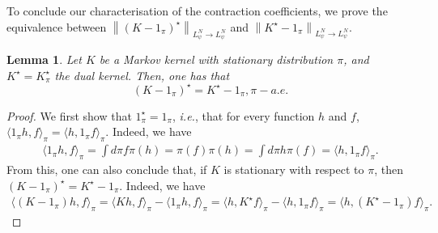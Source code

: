 \documentclass[11pt]{article}
\theoremstyle{plain}
\newtheorem{lemma}[theorem]{Lemma}
\theoremstyle{remark}
\begin{document}
    To conclude our characterisation of the contraction coefficients, we prove the equivalence between $\left\lVert (K - 1_\pi)^\star \right\rVert_{L_\psi^{N}\to L_\psi^{N}}$ and $\left\lVert K^\star - 1_\pi \right\rVert_{L_\psi^{N}\to L_\psi^{N}}$.
    \begin{lemma} Let $K$ be a Markov kernel with stationary distribution $\pi$, and $K^\star=K^\star_\pi$ the dual kernel. Then, one has that 
    \begin{equation}
        (K-1_\pi)^\star = K^\star -1_\pi, \pi-a.e.
    \end{equation}
    \end{lemma}
    \begin{proof} 
    We first show that 
        $1_\pi^\star = 1_\pi$, \textit{i.e.}, that for every function $h$ and $f$, $\langle 1_\pi h,f\rangle_\pi = \langle h, 1_\pi f\rangle_\pi$. 
        Indeed, we have
        \begin{align}
           \langle 1_\pi h, f \rangle_\pi = \int d\pi f \pi(h) = \pi(f)\pi(h) = \int d\pi h \pi(f) = \langle h, 1_\pi f\rangle_\pi .
        \end{align}
        From this, one can also conclude that, if $K$ is stationary with respect to $\pi$, then $(K-1_\pi)^\star = K^\star-1_\pi$.
       Indeed, we have
       \begin{align}
             \langle (K-1_\pi) h, f \rangle_\pi = \langle Kh, f \rangle_\pi - \langle 1_\pi h, f \rangle_\pi = \langle h, K^\star f \rangle_\pi - \langle  h, 1_\pi f \rangle_\pi = \langle h, (K^\star-1_\pi) f \rangle_\pi.
       \end{align}
    \end{proof}
\end{document}
